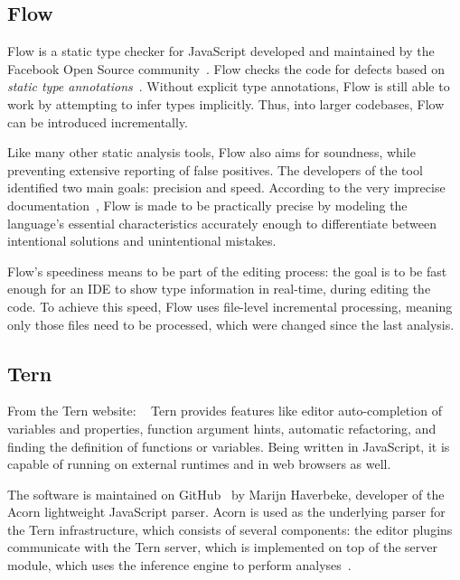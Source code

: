 \subsection{Flow}

Flow is a static type checker for JavaScript developed and maintained by the Facebook Open Source community~\cite{flow-github}. Flow checks the code for defects based on \emph{static type annotations}~\cite{flow-website}. Without explicit type annotations, Flow is still able to work by attempting to infer types implicitly. Thus, into larger codebases, Flow can be introduced incrementally.

Like many other static analysis tools, Flow also aims for soundness, while preventing extensive reporting of false positives. The developers of the tool identified two main goals: precision and speed. According to the very imprecise documentation~\cite{flow-docs}, Flow is made to be practically precise by modeling the language's essential characteristics accurately enough to differentiate between intentional solutions and unintentional mistakes.

Flow's speediness means to be part of the editing process: the goal is to be fast enough for an IDE to show type information in real-time, during editing the code. To achieve this speed, Flow uses file-level incremental processing, meaning only those files need to be processed, which were changed since the last analysis.

\subsection{Tern}

From the Tern website: ~\cite{tern-website} Tern provides features like editor auto-completion of variables and properties, function argument hints, automatic refactoring, and finding the definition of functions or variables. Being written in JavaScript, it is capable of running on external runtimes and in web browsers as well.

The software is maintained on GitHub~\cite{tern-github} by Marijn Haverbeke, developer of the Acorn lightweight JavaScript parser. Acorn is used as the underlying parser for the Tern infrastructure, which consists of several components: the editor plugins communicate with the Tern server, which is implemented on top of the server module, which uses the inference engine to perform analyses~\cite{tern-website}.

